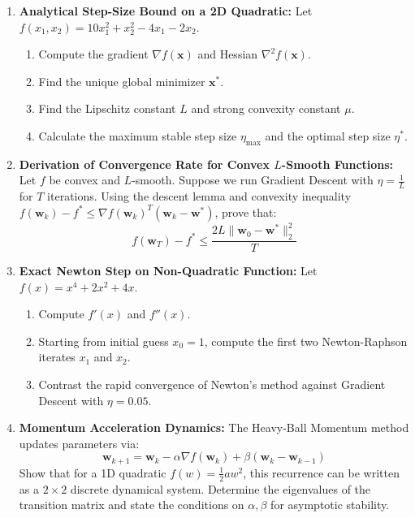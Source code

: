 \begin{enumerate}[label=\textbf{P\arabic*.}]
    \item \textbf{Analytical Step-Size Bound on a 2D Quadratic:}
    Let $f(x_1, x_2) = 10 x_1^2 + x_2^2 - 4x_1 - 2x_2$.
    \begin{enumerate}[label=(\alph*)]
        \item Compute the gradient $\nabla f(\mathbf{x})$ and Hessian $\nabla^2 f(\mathbf{x})$.
        \item Find the unique global minimizer $\mathbf{x}^*$.
        \item Find the Lipschitz constant $L$ and strong convexity constant $\mu$.
        \item Calculate the maximum stable step size $\eta_{\max}$ and the optimal step size $\eta^*$.
    \end{enumerate}

    \item \textbf{Derivation of Convergence Rate for Convex $L$-Smooth Functions:}
    Let $f$ be convex and $L$-smooth. Suppose we run Gradient Descent with $\eta = \frac{1}{L}$ for $T$ iterations.
    Using the descent lemma and convexity inequality $f(\mathbf{w}_k) - f^* \le \nabla f(\mathbf{w}_k)^T (\mathbf{w}_k - \mathbf{w}^*)$, prove that:
    \begin{equation}
    f(\mathbf{w}_T) - f^* \le \frac{2L \|\mathbf{w}_0 - \mathbf{w}^*\|_2^2}{T}
    \end{equation}

    \item \textbf{Exact Newton Step on Non-Quadratic Function:}
    Let $f(x) = x^4 + 2x^2 + 4x$.
    \begin{enumerate}[label=(\alph*)]
        \item Compute $f'(x)$ and $f''(x)$.
        \item Starting from initial guess $x_0 = 1$, compute the first two Newton-Raphson iterates $x_1$ and $x_2$.
        \item Contrast the rapid convergence of Newton's method against Gradient Descent with $\eta = 0.05$.
    \end{enumerate}

    \item \textbf{Momentum Acceleration Dynamics:}
    The Heavy-Ball Momentum method updates parameters via:
    \begin{equation}
    \mathbf{w}_{k+1} = \mathbf{w}_k - \alpha \nabla f(\mathbf{w}_k) + \beta (\mathbf{w}_k - \mathbf{w}_{k-1})
    \end{equation}
    Show that for a 1D quadratic $f(w) = \frac{1}{2} a w^2$, this recurrence can be written as a $2 \times 2$ discrete dynamical system. Determine the eigenvalues of the transition matrix and state the conditions on $\alpha, \beta$ for asymptotic stability.


\end{enumerate}
